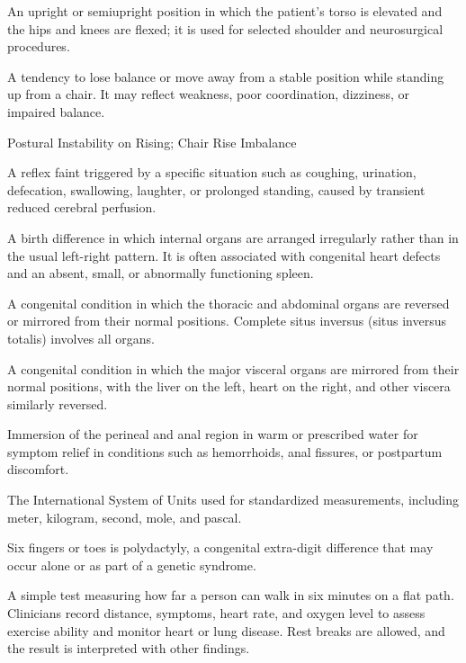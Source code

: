  An upright or semiupright position in which the patient's torso is elevated and the hips and knees are flexed; it is used for selected shoulder and neurosurgical procedures.

 A tendency to lose balance or move away from a stable position while standing up from a chair. It may reflect weakness, poor coordination, dizziness, or impaired balance.

\synonyms
Postural Instability on Rising; Chair Rise Imbalance

 A reflex faint triggered by a specific situation such as coughing, urination, defecation, swallowing, laughter, or prolonged standing, caused by transient reduced cerebral perfusion.

 A birth difference in which internal organs are arranged irregularly rather than in the usual left-right pattern. It is often associated with congenital heart defects and an absent, small, or abnormally functioning spleen.

 A congenital condition in which the thoracic and abdominal organs are reversed or
mirrored from their normal positions. Complete situs inversus (situs inversus totalis)
involves all organs.

 A congenital condition in which the major visceral organs are mirrored from their normal
positions, with the liver on the left, heart on the right, and other viscera similarly
reversed.

 Immersion of the perineal and anal region in warm or prescribed water for symptom relief in conditions such as hemorrhoids, anal fissures, or postpartum discomfort.

 The International System of Units used for standardized measurements, including meter, kilogram, second, mole, and pascal.

 Six fingers or toes is polydactyly, a congenital extra-digit difference that may occur alone or as part of a genetic syndrome.

 A simple test measuring how far a person can walk in six minutes on a flat path. Clinicians record distance, symptoms, heart rate, and oxygen level to assess exercise ability and monitor heart or lung disease. Rest breaks are allowed, and the result is interpreted with other findings.

